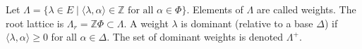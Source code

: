 Let $\Lambda = \{\lambda \in E \mid \langle \lambda, \alpha \rangle \in \mathbb{Z} \text{ for all } \alpha \in \Phi\}$. Elements of $\Lambda$ are called weights. The root lattice is $\Lambda_r = \mathbb{Z}\Phi \subset \Lambda$. A weight $\lambda$ is dominant (relative to a base $\Delta$) if $\langle \lambda, \alpha \rangle \geq 0$ for all $\alpha \in \Delta$. The set of dominant weights is denoted $\Lambda^+$.
